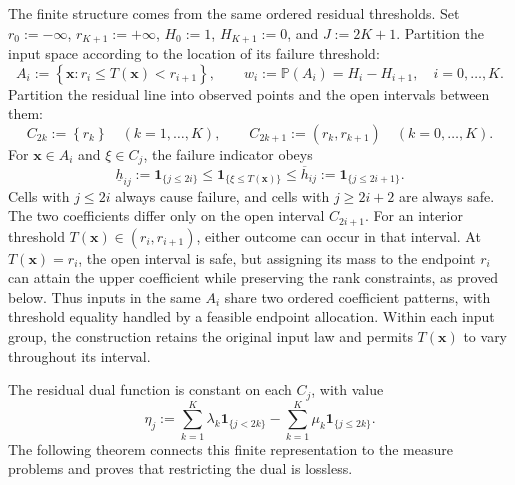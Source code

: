 The finite structure comes from the same ordered residual thresholds. Set $r_0:=-\infty$, $r_{K+1}:=+\infty$, $H_0:=1$, $H_{K+1}:=0$, and $J:=2K+1$. Partition the input space according to the location of its failure threshold:
\begin{equation}
  A_i:=\left\{\bm x:r_i\le T(\bm x)<r_{i+1}\right\},\qquad
  w_i:=\mathbb P\left(A_i\right)=H_i-H_{i+1},\quad i=0,\ldots,K.
  \label{eq-input-cells}
\end{equation}
Partition the residual line into observed points and the open intervals between them:
\begin{equation}
  C_{2k}:=\left\{r_k\right\}\quad(k=1,\ldots,K),\qquad
  C_{2k+1}:=\left(r_k,r_{k+1}\right)\quad(k=0,\ldots,K).
  \label{eq-residual-cells}
\end{equation}
For $\bm x\in A_i$ and $\xi\in C_j$, the failure indicator obeys
\begin{equation}
  \underline h_{ij}:=\mathbf1_{\{j\le2i\}}
  \le\mathbf1_{\{\xi\le T(\bm x)\}}
  \le\overline h_{ij}:=\mathbf1_{\{j\le2i+1\}}.
  \label{eq-cell-costs}
\end{equation}
Cells with $j\le2i$ always cause failure, and cells with $j\ge2i+2$ are always safe. The two coefficients differ only on the open interval $C_{2i+1}$. For an interior threshold $T(\bm x)\in(r_i,r_{i+1})$, either outcome can occur in that interval. At $T(\bm x)=r_i$, the open interval is safe, but assigning its mass to the endpoint $r_i$ can attain the upper coefficient while preserving the rank constraints, as proved below. Thus inputs in the same $A_i$ share two ordered coefficient patterns, with threshold equality handled by a feasible endpoint allocation. Within each input group, the construction retains the original input law and permits $T(\bm x)$ to vary throughout its interval.

The residual dual function is constant on each $C_j$, with value
\begin{equation}
  \eta_j:=\sum_{k=1}^K\lambda_k\mathbf1_{\{j<2k\}}
  -\sum_{k=1}^K\mu_k\mathbf1_{\{j\le2k\}}.
  \label{eq-dual-cell-values}
\end{equation}
The following theorem connects this finite representation to the measure problems and proves that restricting the dual is lossless.

